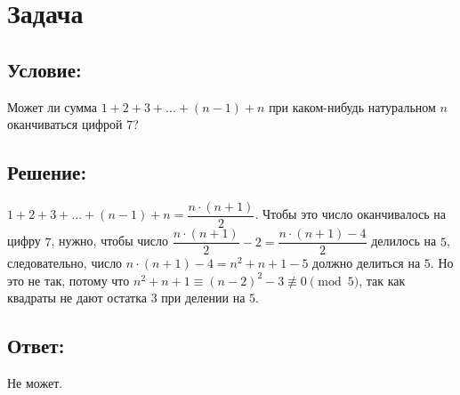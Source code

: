 \section{Задача}

\subsection*{Условие:}
Может ли сумма  $1 + 2 + 3 + ... + (n - 1) + n$  при каком-нибудь натуральном $n$ оканчиваться 
цифрой $7$?

\subsection*{Решение:}
$1 + 2 + 3 + ... + (n - 1) + n = \dfrac{n \cdot (n + 1)}{2}$.  Чтобы это число оканчивалось на 
цифру $7$, нужно, чтобы число  $\dfrac{n \cdot (n + 1)}{2} - 2 = \dfrac{n \cdot (n + 1) - 4}{2}$ 
делилось на $5$, следовательно, число $n \cdot (n + 1) - 4 = n^2 + n + 1 - 5$  должно делиться на
$5$. Но это не так, потому что $n^2 + n + 1 \equiv (n - 2)^2 - 3 \not\equiv 0 \pmod 5$, так как
квадраты не дают остатка $3$ при делении на $5$.

\subsection*{Ответ:}
Не может.